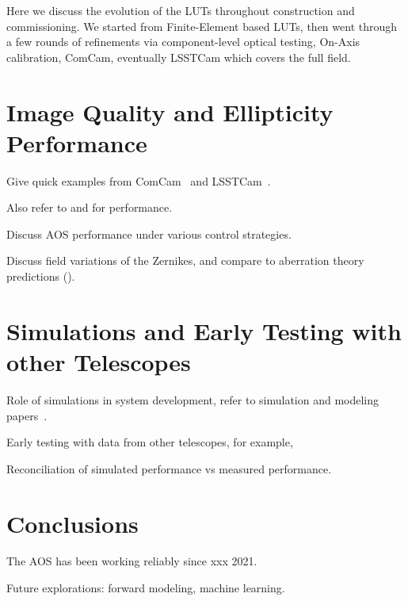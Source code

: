 Here we discuss the evolution of the LUTs throughout construction and commissioning.
We started from Finite-Element based LUTs, then went through a few rounds of refinements via component-level optical testing, On-Axis calibration, ComCam, eventually LSSTCam which covers the full field.

\section{Image Quality and Ellipticity Performance}

Give quick examples from ComCam~\cite{PSTN-033} and LSSTCam~\cite{PSTN-034}.

Also refer to \cite{PSTN-004} and \cite{PSTN-032} for performance.

Discuss AOS performance under various control strategies.

Discuss field variations of the Zernikes, and compare to aberration theory predictions
(\cite{2011PASP..123..812S, 2012SPIE.8444E..55S}).


\section{Simulations and Early Testing with other Telescopes}

Role of simulations in system development, refer to simulation and modeling
papers~\cite{2012SPIE.8444E..4PC,2016SPIE.9911E..18A, 2018SPIE10705E..0PX}.

Early testing with data from other telescopes, for example, \cite{2016SPIE.9906E..4JX}

Reconciliation of simulated performance vs measured performance.

\section{Conclusions}

The AOS has been working reliably since xxx 2021.

Future explorations: forward modeling, machine learning.

